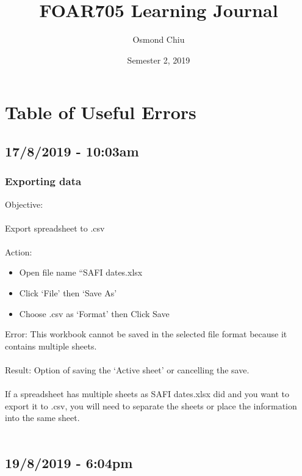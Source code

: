 \documentclass{article}
\title{FOAR705 Learning Journal}
\author{Osmond Chiu}
\date{Semester 2, 2019}
\begin{document}
\maketitle
\tableofcontents

\newpage
\section{Table of Useful Errors}

\subsection*{17/8/2019 - 10:03am}
\subsubsection*{Exporting data}
Objective:\\\\
Export spreadsheet to .csv\\\\
Action:
\begin{itemize}
\item Open file name “SAFI dates.xlsx
\item Click ‘File’ then ‘Save As’
\item Choose .csv as ‘Format’ then Click Save
\end{itemize}
Error: This workbook cannot be saved in the selected file format because it contains multiple sheets.\label{error:CSV export}\\\\
Result: Option of saving the ‘Active sheet’ or cancelling the save.\\\\
If a spreadsheet has multiple sheets as SAFI dates.xlsx did and you want to export it to .csv, you will need to separate the sheets or place the information into the same sheet.\\\\

\subsection*{19/8/2019 - 6:04pm}
\end{document}
